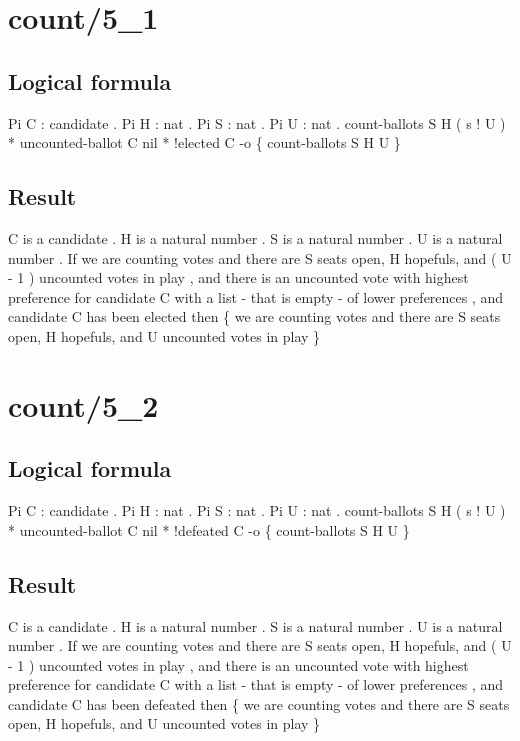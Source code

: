 \section{count/5\_1}
\subsection{Logical formula}
\begin{texto2}
	Pi C : candidate . Pi H : nat . Pi S : nat . Pi U : nat . count-ballots S H ( s ! U ) * uncounted-ballot C nil * !elected C -o \{ count-ballots S H U \}
\end{texto2}

\subsection{Result}
\begin{texto2}
	C is a candidate . H is a natural number . S is a natural number . U is a natural number . If we are counting votes and there are S seats open, H hopefuls, and ( U - 1 ) uncounted votes in play , and there is an uncounted vote with highest preference for candidate C with a list - that is empty - of lower preferences , and candidate C has been elected then \{ we are counting votes and there are S seats open, H hopefuls, and U uncounted votes in play \}
\end{texto2}

\section{count/5\_2}
\subsection{Logical formula}
\begin{texto2}
	Pi C : candidate . Pi H : nat . Pi S : nat . Pi U : nat . count-ballots S H ( s ! U ) * uncounted-ballot C nil * !defeated C -o \{ count-ballots S H U \}
\end{texto2}

\subsection{Result}
\begin{texto2}
	C is a candidate . H is a natural number . S is a natural number . U is a natural number . If we are counting votes and there are S seats open, H hopefuls, and ( U - 1 ) uncounted votes in play , and there is an uncounted vote with highest preference for candidate C with a list - that is empty - of lower preferences , and candidate C has been defeated then \{ we are counting votes and there are S seats open, H hopefuls, and U uncounted votes in play \}
\end{texto2}

